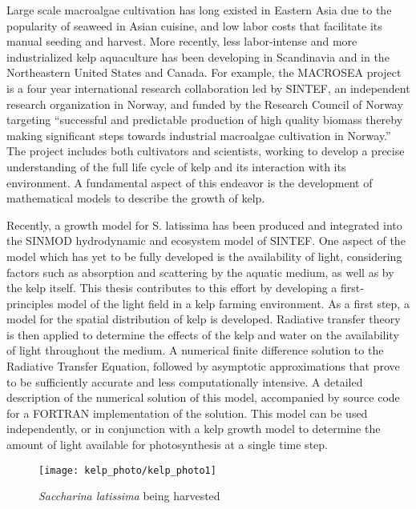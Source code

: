 Large scale macroalgae cultivation has long existed in Eastern Asia due to the popularity of seaweed in Asian cuisine, and low labor costs that facilitate its manual seeding and harvest.
  More recently, less labor-intense and more industrialized kelp aquaculture has been developing in Scandinavia and in the Northeastern United States and Canada.
For example, the MACROSEA project is a four year international research collaboration led by SINTEF, an independent research organization in Norway, and funded by the Research Council of Norway targeting ``successful and predictable production of high quality biomass thereby making significant steps towards industrial macroalgae cultivation in Norway.'' %
The project includes both cultivators and scientists, working to develop a precise understanding of the full life cycle of kelp and its interaction with its environment.
A fundamental aspect of this endeavor is the development of mathematical models to describe the growth of kelp.

Recently, a growth model \cite{broch_modelling_2012} for S. latissima has been produced and integrated into the SINMOD \cite{wassmann_modelling_2006} hydrodynamic and ecosystem model of SINTEF.
One aspect of the model which has yet to be fully developed is the availability of light, considering factors such as absorption and scattering by the aquatic medium, as well as by the kelp itself.
This thesis contributes to this effort by developing a first-principles model of the light field in a kelp farming environment.
As a first step, a model for the spatial distribution of kelp is developed.
Radiative transfer theory is then applied to determine the effects of the kelp and water on the availability of light throughout the medium.
A numerical finite difference solution to the Radiative Transfer Equation, followed by asymptotic approximations that prove to be sufficiently accurate and less computationally intensive.
A detailed description of the numerical solution of this model, accompanied by source code for a FORTRAN implementation of the solution.
This model can be used independently, or in conjunction with a kelp growth model to determine the amount of light available for photosynthesis at a single time step.

\begin{figure}[h]
  \centering
  \texttt{[image: kelp\_photo/kelp\_photo1]}
  \caption{\textit{Saccharina latissima} being harvested}
\end{figure}


